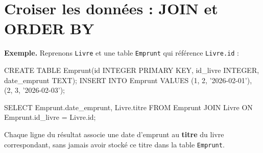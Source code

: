 
\section{Croiser les données : JOIN et ORDER BY}



\textbf{Exemple.} Reprenons \texttt{Livre} et une table \texttt{Emprunt} qui référence \texttt{Livre.id} :
\begin{sql}
CREATE TABLE Emprunt(id INTEGER PRIMARY KEY, id_livre INTEGER, date_emprunt TEXT);
INSERT INTO Emprunt VALUES (1, 2, '2026-02-01'), (2, 3, '2026-02-03');

SELECT Emprunt.date_emprunt, Livre.titre
FROM Emprunt
JOIN Livre ON Emprunt.id_livre = Livre.id;
\end{sql}
Chaque ligne du résultat associe une date d'emprunt au \textbf{titre} du livre correspondant, sans jamais avoir stocké ce titre dans la table \texttt{Emprunt}.



